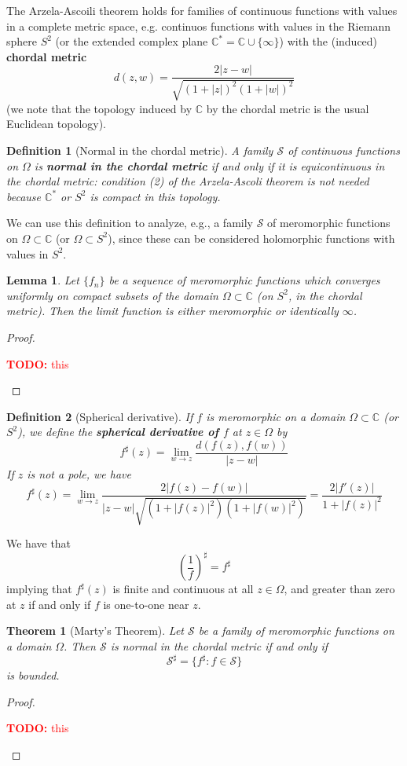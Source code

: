 \documentclass{article}
\newtheorem{theorem}{Theorem}
\newtheorem{lemma}{Lemma}
\newcommand{\mbb}[1]{\mathbb{#1}}
\newcommand{\mc}[1]{\mathcal{#1}}
\newtheorem{definition}{Definition}
\newcommand{\TODO}[1]{\begin{center}\huge{\textcolor{red}{\textbf{TODO:} #1}}\end{center}}
\begin{document}
The Arzela-Ascoili theorem holds for families of continuous functions with values in a complete metric space, e.g. continuos functions with values in the Riemann sphere \(S^2\) (or the extended complex plane \(\mbb{C}^* = \mbb{C} \cup \{\infty\}\)) with the (induced) \textbf{chordal metric}
\[d(z, w) = \frac{2|z - w|}{\sqrt{(1 + |z|)^2(1 + |w|)^2}}\]
(we note that the topology induced by \(\mbb{C}\) by the chordal metric is the usual Euclidean topology).
\begin{definition}[Normal in the chordal metric]
A family \(\mc{S}\) of continuous functions on \(\Omega\) is \textbf{normal in the chordal metric} if and only if it is equicontinuous in the chordal metric: condition (2) of the Arzela-Ascoli theorem is not needed because \(\mbb{C}^*\) or \(S^2\) is compact in this topology.
\end{definition}
We can use this definition to analyze, e.g., a family \(\mc{S}\) of meromorphic functions on \(\Omega \subset \mbb{C}\) (or \(\Omega \subset S^2\)), since these can be considered holomorphic functions with values in \(S^2\).
\begin{lemma}
Let \(\{f_n\}\) be a sequence of meromorphic functions which converges uniformly on compact subsets of the domain \(\Omega \subset \mbb{C}\) (on \(S^2\), in the chordal metric). Then the limit function is either meromorphic or identically \(\infty\).
\end{lemma}
\begin{proof}
\TODO{this}
\end{proof}
\begin{definition}[Spherical derivative]
If \(f\) is meromorphic on a domain \(\Omega \subset \mbb{C}\) (or \(S^2\)), we define the \textbf{spherical derivative of \(f\)} at \(z \in \Omega\) by
\[f^\sharp(z) = \lim_{w \to z}\frac{d(f(z), f(w))}{|z - w|}\]
If \(z\) is not a pole, we have
\[f^\sharp(z) = \lim_{w \to z}\frac{2|f(z) - f(w)|}{|z - w|\sqrt{(1 + |f(z)|^2)(1 + |f(w)|^2)}} = \frac{2|f'(z)|}{1 + |f(z)|^2}\]
\end{definition}
We have that
\[\left(\frac{1}{f}\right)^\sharp = f^\sharp\]
implying that \(f^\sharp(z)\) is finite and continuous at all \(z \in \Omega\), and greater than zero at \(z\) if and only if \(f\) is one-to-one near \(z\).
\begin{theorem}[Marty's Theorem]
Let \(\mc{S}\) be a family of meromorphic functions on a domain \(\Omega\). Then \(\mc{S}\) is normal in the chordal metric if and only if
\[\mc{S}^\sharp = \{f^\sharp : f \in \mc{S}\}\]
is bounded.
\end{theorem}
\begin{proof}
\TODO{this}
\end{proof}
\end{document}
